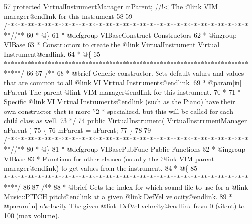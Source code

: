 \begin{DoxyCodeInclude}
57 \textcolor{comment}{}    \textcolor{keyword}{protected} \hyperlink{class_virtual_instrument_manager}{VirtualInstrumentManager}           \hyperlink{group___v_i_base_pro_var_gae4a87a656d9448cfea28215a6b9c3840}{mParent}; \textcolor{comment}{//!< The @link VIM
       manager@endlink for this instrument}
58 \textcolor{comment}{}
59     \textcolor{comment}{/*************************************************************************/}\textcolor{comment}{/** }
60 \textcolor{comment}{     * @\}}
61 \textcolor{comment}{     * @defgroup VIBaseConstruct Constructors}
62 \textcolor{comment}{     * @ingroup VIBase}
63 \textcolor{comment}{     * Constructors to create the @link VirtualInstrument Virtual Instrument@endlink.}
64 \textcolor{comment}{     * @\{}
65 \textcolor{comment}{    *****************************************************************************/}
66 \textcolor{comment}{}
67 \textcolor{comment}{    /**}
68 \textcolor{comment}{     * @brief Generic constructor. Sets default values and values that are common to all @link VI Virtual
       Instruments@endlink. }
69 \textcolor{comment}{     * @param[in] aParent The parent @link VIM manager@endlink for this instrument.}
70 \textcolor{comment}{     *  }
71 \textcolor{comment}{     * Specific @link VI Virtual Instruments@endlink (such as the Piano) have their own constructor that is
       more}
72 \textcolor{comment}{     * specialized, but this will be called for each child class as well. }
73 \textcolor{comment}{     */}
74     \textcolor{keyword}{public} \hyperlink{group___v_i_base_construct_ga7b438b5f812fa0d3a6e91d74a3c261c9}{VirtualInstrument}( \hyperlink{class_virtual_instrument_manager}{VirtualInstrumentManager} aParent )
75     \{
76         mParent = aParent;
77     \}
78 
79     \textcolor{comment}{/*************************************************************************/}\textcolor{comment}{/** }
80 \textcolor{comment}{     * @\}}
81 \textcolor{comment}{     * @defgroup VIBasePubFunc Public Functions}
82 \textcolor{comment}{     * @ingroup VIBase}
83 \textcolor{comment}{     * Functions for other classes (usually the @link VIM parent manager@endlink) to get values from the
       instrument.}
84 \textcolor{comment}{     * @\{}
85 \textcolor{comment}{     ****************************************************************************/}
86 \textcolor{comment}{}
87 \textcolor{comment}{    /** }
88 \textcolor{comment}{     * @brief Gets the index for which sound file to use for a @link Music::PITCH pitch@endlink at a given
       @link DefVel velocity@endlink.}
89 \textcolor{comment}{     * @param[in] aVelocity The given @link DefVel velocity@endlink from 0 (silent) to 100 (max volume).}

\end{DoxyCodeInclude}
